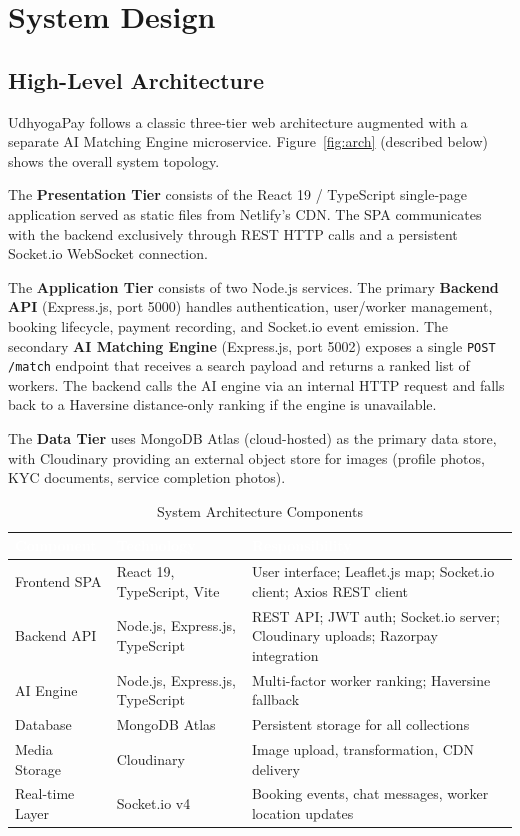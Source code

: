 \documentclass[12pt,a4paper]{report}
\newcommand{\thead}[1]{\cellcolor{tableheader}\textcolor{white}{\textbf{#1}}}
\begin{document}
\chapter{System Design}

\section{High-Level Architecture}

UdhyogaPay follows a classic three-tier web architecture augmented with a separate AI Matching Engine microservice. Figure~\ref{fig:arch} (described below) shows the overall system topology.

The \textbf{Presentation Tier} consists of the React 19 / TypeScript single-page application served as static files from Netlify's CDN. The SPA communicates with the backend exclusively through REST HTTP calls and a persistent Socket.io WebSocket connection.

The \textbf{Application Tier} consists of two Node.js services. The primary \textbf{Backend API} (Express.js, port 5000) handles authentication, user/worker management, booking lifecycle, payment recording, and Socket.io event emission. The secondary \textbf{AI Matching Engine} (Express.js, port 5002) exposes a single \texttt{POST /match} endpoint that receives a search payload and returns a ranked list of workers. The backend calls the AI engine via an internal HTTP request and falls back to a Haversine distance-only ranking if the engine is unavailable.

The \textbf{Data Tier} uses MongoDB Atlas (cloud-hosted) as the primary data store, with Cloudinary providing an external object store for images (profile photos, KYC documents, service completion photos).

\begin{table}[h!]
\centering
\caption{System Architecture Components}
\label{tab:archcomponents}
\renewcommand{\arraystretch}{1.4}
\begin{tabular}{|p{3.5cm}|p{4cm}|p{6cm}|}
\hline
\thead{Component} & \thead{Technology} & \thead{Responsibility} \\
\hline
Frontend SPA & React 19, TypeScript, Vite & User interface; Leaflet.js map; Socket.io client; Axios REST client \\
\hline
Backend API & Node.js, Express.js, TypeScript & REST API; JWT auth; Socket.io server; Cloudinary uploads; Razorpay integration \\
\hline
AI Engine & Node.js, Express.js, TypeScript & Multi-factor worker ranking; Haversine fallback \\
\hline
Database & MongoDB Atlas & Persistent storage for all collections \\
\hline
Media Storage & Cloudinary & Image upload, transformation, CDN delivery \\
\hline
Real-time Layer & Socket.io v4 & Booking events, chat messages, worker location updates \\
\hline
\end{tabular}
\end{table}
\end{document}
